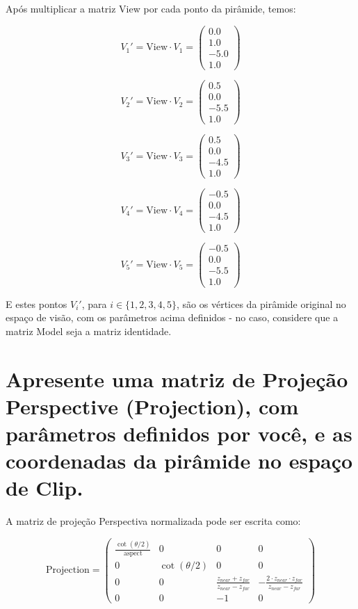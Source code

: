 \documentclass{article}
\begin{document}
Após multiplicar a matriz View por cada ponto da pirâmide, temos:

$$V_1' = \text{View} \cdot V_1 = \begin{pmatrix}
0.0 \\
1.0 \\
-5.0 \\
1.0 
\end{pmatrix}$$

$$V_2' = \text{View} \cdot V_2 = \begin{pmatrix}
	0.5 \\
	0.0 \\
	-5.5 \\
	1.0 
\end{pmatrix}$$

$$V_3' = \text{View} \cdot V_3 = \begin{pmatrix}
	0.5 \\
	0.0 \\
	-4.5 \\
	1.0 
\end{pmatrix}$$

$$V_4' = \text{View} \cdot V_4 = \begin{pmatrix}
	-0.5 \\
	0.0 \\
	-4.5 \\
	1.0 
\end{pmatrix}$$

$$V_5' = \text{View} \cdot V_5 = \begin{pmatrix}
	-0.5 \\
	0.0 \\
	-5.5 \\
	1.0 
\end{pmatrix}$$

E estes pontos $V_i'$, para $i \in \{1, 2, 3, 4, 5\}$, são os vértices da pirâmide original no espaço de visão, com os parâmetros acima definidos - no caso, considere que a matriz Model seja a matriz identidade.


\section{Apresente uma matriz de Projeção Perspective (Projection), com parâmetros definidos por você, e as coordenadas da pirâmide no espaço de Clip.}

A matriz de projeção Perspectiva normalizada pode ser escrita como:

$$\text{Projection} = \begin{pmatrix}
\frac{\cot{(\theta/2)}}{\text{aspect}} & 0 & 0 & 0\\
0 & \cot{(\theta/2)} & 0 & 0\\
0 & 0 & \frac{z_{near} + z_{far}}{z_{near} - z_{far}} & - \frac{2 \cdot z_{near} \cdot z_{far}}{z_{near} - z_{far}}\\
0 & 0 & -1 & 0
\end{pmatrix}$$
\end{document}
